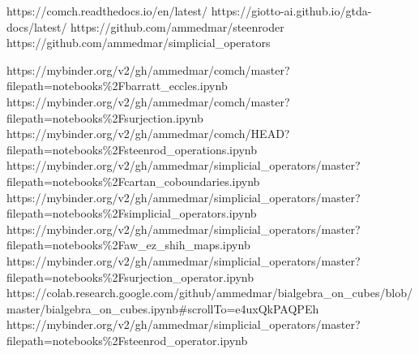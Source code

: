 \vspace*{-10pt} 

		{https://comch.readthedocs.io/en/latest/}
		{https://giotto-ai.github.io/gtda-docs/latest/}
		{https://github.com/ammedmar/steenroder}
		{https://github.com/ammedmar/simplicial_operators}

\vspace*{-10pt} 
		{https://mybinder.org/v2/gh/ammedmar/comch/master?filepath=notebooks\%2Fbarratt_eccles.ipynb}
		{https://mybinder.org/v2/gh/ammedmar/comch/master?filepath=notebooks\%2Fsurjection.ipynb}
		{https://mybinder.org/v2/gh/ammedmar/comch/HEAD?filepath=notebooks\%2Fsteenrod_operations.ipynb}
		{https://mybinder.org/v2/gh/ammedmar/simplicial_operators/master?filepath=notebooks\%2Fcartan_coboundaries.ipynb}
		{https://mybinder.org/v2/gh/ammedmar/simplicial_operators/master?filepath=notebooks\%2Fsimplicial_operators.ipynb}
		{https://mybinder.org/v2/gh/ammedmar/simplicial_operators/master?filepath=notebooks\%2Faw_ez_shih_maps.ipynb}
		{https://mybinder.org/v2/gh/ammedmar/simplicial_operators/master?filepath=notebooks\%2Fsurjection_operator.ipynb}
		{https://colab.research.google.com/github/ammedmar/bialgebra_on_cubes/blob/master/bialgebra_on_cubes.ipynb\#scrollTo=e4uxQkPAQPEh}
		{https://mybinder.org/v2/gh/ammedmar/simplicial_operators/master?filepath=notebooks\%2Fsteenrod_operator.ipynb}